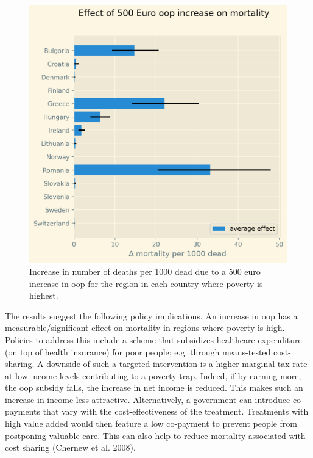 \documentclass[a4paper,12pt]{article}
\makeatletter
\newcommand{\citeprocitem}[2]{\hyper@linkstart{cite}{citeproc_bib_item_#1}#2\hyper@linkend}
\makeatother
\begin{document}
\begin{figure}[htbp]
\centering
\includegraphics[width=.9\linewidth]{./figures/change_mortality_countries_baseline.png}
\caption{\label{fig:SummaryFigure}Increase in number of deaths per 1000 dead due to a 500 euro increase in oop for the region in each country where poverty is highest.}
\end{figure}


The results suggest the following policy implications. An increase in oop has a measurable/significant effect on mortality in regions where poverty is high. Policies to address this include a scheme that subsidizes healthcare expenditure (on top of health insurance) for poor people; e.g. through means-tested cost-sharing. A downside of such a targeted intervention is a higher marginal tax rate at low income levels contributing to a poverty trap. Indeed, if by earning more, the oop subsidy falls, the increase in net income is reduced. This makes such an increase in income less attractive. Alternatively, a government can introduce co-payments that vary with the cost-effectiveness of the treatment. Treatments with high value added would then feature a low co-payment to prevent people from postponing valuable care. This can also help to reduce mortality associated with cost sharing (\citeprocitem{8}{Chernew et al. 2008}).
\end{document}

